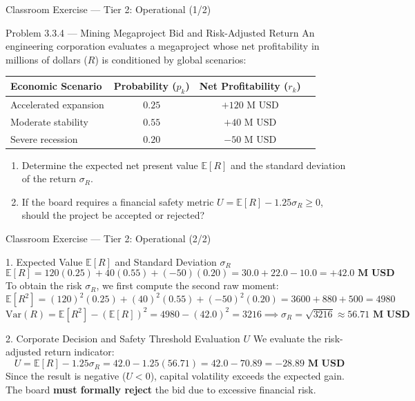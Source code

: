 \documentclass[aspectratio=169,xcolor={dvipsnames,table}]{beamer}
\begin{document}
\begin{frame}{Classroom Exercise --- Tier 2: Operational (1/2)}
	\begin{block}{Problem 3.3.4 --- Mining Megaproject Bid and Risk-Adjusted Return}
		\footnotesize
		An engineering corporation evaluates a megaproject whose net profitability in millions of dollars ($R$) is conditioned by global scenarios:
		\begin{table}[h]
			\centering
			\begin{tabular}{l|ccc}
				\toprule
				\textbf{Economic Scenario} & \textbf{Probability ($p_k$)} & \textbf{Net Profitability ($r_k$)} \\
				\midrule
				Accelerated expansion & $0.25$ & $+120\text{ M USD}$ \\
				Moderate stability & $0.55$ & $+40\text{ M USD}$ \\
				Severe recession & $0.20$ & $-50\text{ M USD}$ \\
				\bottomrule
			\end{tabular}
		\end{table}
		\begin{enumerate}\itemsep=0.1cm
			\item Determine the expected net present value $\mathbb{E}[R]$ and the standard deviation of the return $\sigma_R$.
			\item If the board requires a financial safety metric $U = \mathbb{E}[R] - 1.25\sigma_R \ge 0$, should the project be accepted or rejected?
		\end{enumerate}
	\end{block}
\end{frame}

\begin{frame}{Classroom Exercise --- Tier 2: Operational (2/2)}
	\fontsize{6.8pt}{8.2pt}\selectfont
	\begin{block}{1. Expected Value $\mathbb{E}[R]$ and Standard Deviation $\sigma_R$}
		\fontsize{6.8pt}{8.2pt}\selectfont
		$$\mathbb{E}[R] = 120(0.25) + 40(0.55) + (-50)(0.20) = 30.0 + 22.0 - 10.0 = \mathbf{+42.0\text{ M USD}}$$
		To obtain the risk $\sigma_R$, we first compute the second raw moment:
		$$\mathbb{E}[R^2] = (120)^2(0.25) + (40)^2(0.55) + (-50)^2(0.20) = 3600 + 880 + 500 = 4980$$
		$$\text{Var}(R) = \mathbb{E}[R^2] - (\mathbb{E}[R])^2 = 4980 - (42.0)^2 = 3216 \implies \sigma_R = \sqrt{3216} \approx \mathbf{56.71\text{ M USD}}$$
	\end{block}

	\vspace{-0.15cm}
	\pause
	\begin{alertblock}{2. Corporate Decision and Safety Threshold Evaluation $U$}
		\fontsize{6.8pt}{8.2pt}\selectfont
		We evaluate the risk-adjusted return indicator:
		$$U = \mathbb{E}[R] - 1.25\sigma_R = 42.0 - 1.25(56.71) = 42.0 - 70.89 = \mathbf{-28.89\text{ M USD}}$$
		Since the result is negative ($U < 0$), capital volatility exceeds the expected gain. The board \textbf{must formally reject} the bid due to excessive financial risk.
	\end{alertblock}
\end{frame}
\end{document}
